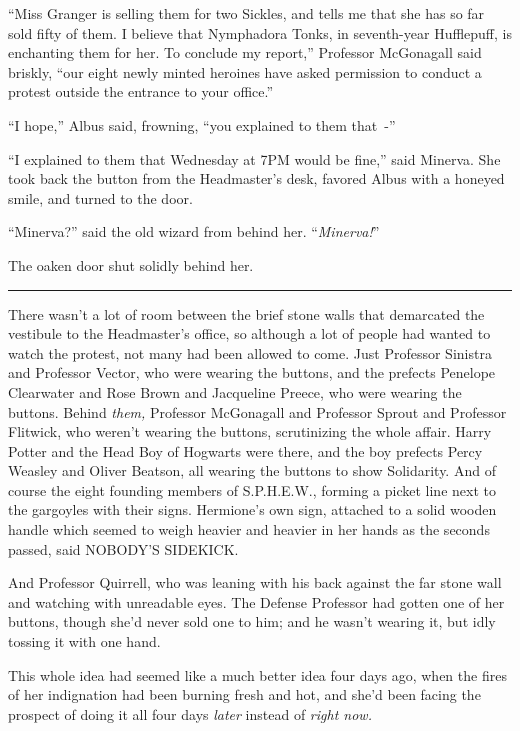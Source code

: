 ``Miss Granger is selling them for two Sickles, and tells me that she has so far sold fifty of them. I believe that Nymphadora Tonks, in seventh-year Hufflepuff, is enchanting them for her. To conclude my report,'' Professor McGonagall said briskly, ``our eight newly minted heroines have asked permission to conduct a protest outside the entrance to your office.''

``I hope,'' Albus said, frowning, ``you explained to them that~-''

``I explained to them that Wednesday at 7PM would be fine,'' said Minerva. She took back the button from the Headmaster's desk, favored Albus with a honeyed smile, and turned to the door.

``Minerva?'' said the old wizard from behind her. ``\emph{Minerva!}''

The oaken door shut solidly behind her.

\begin{center}\rule{3in}{0.4pt}\end{center}

There wasn't a lot of room between the brief stone walls that demarcated the vestibule to the Headmaster's office, so although a lot of people had wanted to watch the protest, not many had been allowed to come. Just Professor Sinistra and Professor Vector, who were wearing the buttons, and the prefects Penelope Clearwater and Rose Brown and Jacqueline Preece, who were wearing the buttons. Behind \emph{them,} Professor McGonagall and Professor Sprout and Professor Flitwick, who weren't wearing the buttons, scrutinizing the whole affair. Harry Potter and the Head Boy of Hogwarts were there, and the boy prefects Percy Weasley and Oliver Beatson, all wearing the buttons to show Solidarity. And of course the eight founding members of S.P.H.E.W., forming a picket line next to the gargoyles with their signs. Hermione's own sign, attached to a solid wooden handle which seemed to weigh heavier and heavier in her hands as the seconds passed, said NOBODY'S SIDEKICK.

And Professor Quirrell, who was leaning with his back against the far stone wall and watching with unreadable eyes. The Defense Professor had gotten one of her buttons, though she'd never sold one to him; and he wasn't wearing it, but idly tossing it with one hand.

This whole idea had seemed like a much better idea four days ago, when the fires of her indignation had been burning fresh and hot, and she'd been facing the prospect of doing it all four days \emph{later} instead of \emph{right now.}

